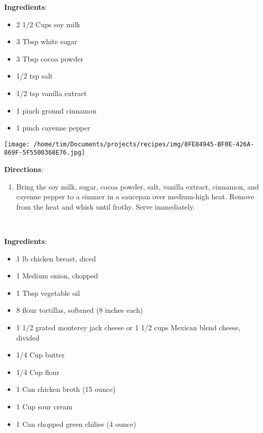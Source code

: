 \documentclass[11pt, twoside, openany]{book}
\begin{document}
\begin{minipage}[t]{0.8\linewidth}
\textbf{Ingredients}:\vspace{-3mm}
\begin{multicols}{2}
\begin{itemize}\setlength\itemsep{-1mm}
\item 2 1/2 Cups soy milk
\item 3 Tbsp white sugar
\item 3 Tbsp cocoa powder
\item 1/2 tsp salt
\item 1/2 tsp vanilla extract
\item 1 pinch ground cinnamon
\item 1 pinch cayenne pepper
\end{itemize}
\end{multicols}
\end{minipage}
\begin{minipage}[t]{0.2\linewidth}
\centering \strut\vspace*{-\baselineskip}\newline
\texttt{[image: /home/tim/Documents/projects/recipes/img/8FE84945-BF0E-426A-869F-5F5500368E76.jpg]}\\
\end{minipage}\vspace{3mm}
\textbf{Directions}:
\vspace{-3mm}\begin{enumerate}\setlength\itemsep{-1mm}
\item Bring the soy milk, sugar, cocoa powder, salt, vanilla extract, cinnamon, and cayenne pepper to a simmer in a saucepan over medium-high heat. Remove from the heat and whisk until frothy. Serve immediately.
\end{enumerate}
 \label{chicken-enchiladas}\hfill\textit{}\\
\begin{minipage}[t]{0.8\linewidth}
\textbf{Ingredients}:\vspace{-3mm}
\begin{multicols}{2}
\begin{itemize}\setlength\itemsep{-1mm}
\item 1 lb chicken breast, diced
\item 1 Medium onion, chopped
\item 1 Tbsp vegetable oil
\item 8 flour tortillas, softened (8 inches each)
\item 1 1/2 grated monterey jack cheese or 1 1/2 cups Mexican blend cheese, divided
\item 1/4 Cup butter
\item 1/4 Cup flour
\item 1 Can chicken broth (15 ounce)
\item 1 Cup sour cream
\item 1 Can chopped green chilies (4 ounce)
\end{itemize}
\end{multicols}
\end{minipage}
\end{document}
